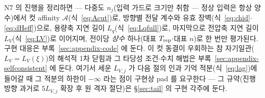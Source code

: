 N7 의 진행을 정리하면 --- 다중도 $n_j$(입력 가드로 크기만 취함 --- 정상 입력은 항상 양수)에서 컷 affinity $\mathcal A$(식~\eqref{eq:Acut})로,
방향별 전달 계수와 유효 장벽(식~\eqref{eq:chid}$\cdot$\eqref{eq:dHeff})으로, 용량축 지연 길이
$L_q$(식~\eqref{eq:Lqfull})로, 마지막으로 전압축 지연 길이 $L_V$(식~\eqref{eq:LV})로 이어지며, 전이당
\emph{상수} 하나(대표 $T_{\mathrm{rep}}\cdot$대표 $n$)로 한 번만 평가된다. 구현 대응은
부록~\ref{sec:appendix-code} 에 둔다. 이 컷 동결이 우회하는 참 자기일관($L_V=L_V(\xi)$)의 해석적 1차 닫힘과 그
타당성 조건$\cdot$수치 해법은 부록~\ref{sec:appendix-selfconsistent} 에 둔다.
여기서 세운 $L_{V,j}$ 가 다음 절의 인과 기억 적분(식~\eqref{eq:lag})에 들어갈 때 그 적분의 하한이 $-\infty$
라는 점이 구현상 pad 를 요구한다 --- 그 규약(진행방향 과거로 $5L_{V,j}$ 확장 후 원 격자 절단)은
\S\ref{sec:tail} 의 구현 각주에 둔다.

